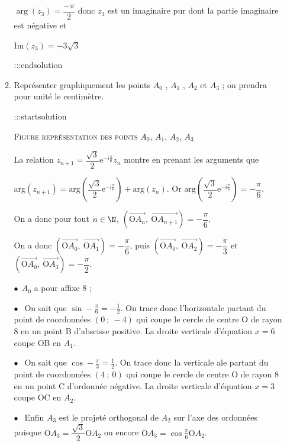\documentclass{cornouaille}
\begin{document}
\begin{enumerate}
\begin{enumerate}
$\arg(z_3) = \dfrac{-\pi}{2}$ donc $z_3$ est un imaginaire pur dont la partie imaginaire est négative et

$\boxed{ \text{Im}\left(z_3\right) = - 3\sqrt{3} }$


:::endsolution
\item Représenter graphiquement les points $A_0$ , $A_1$ , $A_2$ et $A_3$ ; on prendra pour unité le centimètre.


:::startsolution

\textsc{Figure représentation des points $A_0$, \:$A_1$, \:$A_2$, \:$A_3$}

La relation $z_{n+1} = \dfrac{\sqrt{3}}{2}\text{e}^{- \text{i}\frac{\pi}{6}}z_n$ montre en prenant les arguments que

arg$\left(z_{n+1} \right) = \text{arg}\left(\dfrac{\sqrt{3}}{2}\text{e}^{- \text{i}\frac{\pi}{6}}\right) + \text{arg}\left(z_n\right)$.
Or $\text{arg}\left(\dfrac{\sqrt{3}}{2}\text{e}^{- \text{i}\frac{\pi}{6}} \right) = - \dfrac{\pi}{6}$.

On a donc pour tout $n \in \N$, $\left(\overrightarrow{\text{O}A_n},~\overrightarrow{\text{O}A_{n+1}} \right) = - \dfrac{\pi}{6}$.

On a donc $\left(\overrightarrow{\text{O}A_0},~\overrightarrow{\text{O}A_{1}} \right) = - \dfrac{\pi}{6}$, puis
$\left(\overrightarrow{\text{O}A_0},~\overrightarrow{\text{O}A_{2}} \right) = - \dfrac{\pi}{3}$ et $\left(\overrightarrow{\text{O}A_0},~\overrightarrow{\text{O}A_{3}} \right) = - \dfrac{\pi}{2}$.

\smallskip

$\bullet~~$$A_0$ a pour affixe 8 ;

$\bullet~~$ On sait que $\sin - \frac{\pi}{6} = - \frac{1}{2}$. On trace donc l'horizontale partant du point de coordonnées $(0~;~- 4)$ qui coupe le cercle de centre O de rayon 8 en un point B d'abscisse positive. La droite verticale d'équation $x = 6$ coupe OB en $A_1$.

$\bullet~~$ On sait que $\cos - \frac{\pi}{3} =  \frac{1}{2}$. On trace donc la verticale ale partant du point de coordonnées $(4~;~0)$ qui coupe le cercle de centre O de rayon 8 en un point C d'ordonnée négative. La droite verticale  d'équation $x = 3$ coupe OC en $A_2$.

$\bullet~~$ Enfin $A_3$ est le projeté orthogonal de $A_2$ sur l'axe des ordonnées puisque $\text{O}A_3 = \dfrac{\sqrt{3}}{2}\text{O}A_2$ ou encore $\text{O}A_3 = \cos \frac{\pi}{6}\text{O}A_2$.



\end{enumerate}
\end{enumerate}
\end{document}
